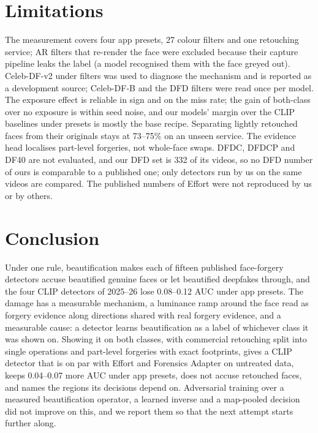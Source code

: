 \documentclass[conference]{IEEEtran}
\begin{document}
\section{Limitations}
The measurement covers four app presets, 27 colour filters and one retouching service; AR filters that re-render the
face were excluded because their capture pipeline leaks the label (a model recognised them with the face greyed out).
Celeb-DF-v2 under filters was used to diagnose the mechanism and is reported as a development source; Celeb-DF-B and the
DFD filters were read once per model. The exposure effect is reliable in sign and on the miss rate; the gain of
both-class over no exposure is within seed noise, and our models' margin over the CLIP baselines under presets is mostly
the base recipe. Separating lightly retouched faces from their originals stays at 73--75\% on an unseen service. The
evidence head localises part-level forgeries, not whole-face swaps. DFDC, DFDCP and DF40 are not evaluated, and our DFD
set is 332 of its videos, so no DFD number of ours is comparable to a published one; only detectors run by us on the same
videos are compared. The published numbers of Effort were not reproduced by us or by others.

\section{Conclusion}
Under one rule, beautification makes each of fifteen published face-forgery detectors accuse beautified genuine faces or
let beautified deepfakes through, and the four CLIP detectors of 2025--26 lose 0.08--0.12 AUC under app presets. The damage has a measurable
mechanism, a luminance ramp around the face read as forgery evidence along directions shared with real forgery evidence,
and a measurable cause: a detector learns beautification as a label of whichever class it was shown on. Showing it on
both classes, with commercial retouching split into single operations and part-level forgeries with exact footprints,
gives a CLIP detector that is on par with Effort and Forensics Adapter on untreated data, keeps 0.04--0.07 more AUC under
app presets, does not accuse retouched faces, and names the regions its decisions depend on. Adversarial training over a
measured beautification operator, a learned inverse and a map-pooled decision did not improve on this, and we report
them so that the next attempt starts further along.



\end{document}

